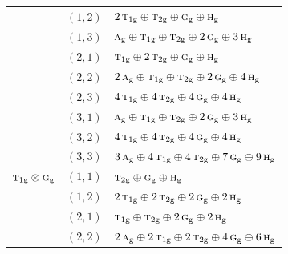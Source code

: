 \documentclass[11pt]{article}
\newcommand{\irr}[1]{\text{\normalfont\scshape #1}}
\newcommand{\ptag}[1]{\mathrm{#1}}
\begin{document}
\begin{longtable}{p{} c p{}}
 & $(1,2)$ & $2\,\irr{t}_{1\ptag{g}}\oplus \irr{t}_{2\ptag{g}}\oplus \irr{g}_{\ptag{g}}\oplus \irr{h}_{\ptag{g}}$\\

 & $(1,3)$ & $\irr{a}_{\ptag{g}}\oplus \irr{t}_{1\ptag{g}}\oplus \irr{t}_{2\ptag{g}}\oplus 2\,\irr{g}_{\ptag{g}}\oplus 3\,\irr{h}_{\ptag{g}}$\\

 & $(2,1)$ & $\irr{t}_{1\ptag{g}}\oplus 2\,\irr{t}_{2\ptag{g}}\oplus \irr{g}_{\ptag{g}}\oplus \irr{h}_{\ptag{g}}$\\

 & $(2,2)$ & $2\,\irr{a}_{\ptag{g}}\oplus \irr{t}_{1\ptag{g}}\oplus \irr{t}_{2\ptag{g}}\oplus 2\,\irr{g}_{\ptag{g}}\oplus 4\,\irr{h}_{\ptag{g}}$\\

 & $(2,3)$ & $4\,\irr{t}_{1\ptag{g}}\oplus 4\,\irr{t}_{2\ptag{g}}\oplus 4\,\irr{g}_{\ptag{g}}\oplus 4\,\irr{h}_{\ptag{g}}$\\

 & $(3,1)$ & $\irr{a}_{\ptag{g}}\oplus \irr{t}_{1\ptag{g}}\oplus \irr{t}_{2\ptag{g}}\oplus 2\,\irr{g}_{\ptag{g}}\oplus 3\,\irr{h}_{\ptag{g}}$\\

 & $(3,2)$ & $4\,\irr{t}_{1\ptag{g}}\oplus 4\,\irr{t}_{2\ptag{g}}\oplus 4\,\irr{g}_{\ptag{g}}\oplus 4\,\irr{h}_{\ptag{g}}$\\

 & $(3,3)$ & $3\,\irr{a}_{\ptag{g}}\oplus 4\,\irr{t}_{1\ptag{g}}\oplus 4\,\irr{t}_{2\ptag{g}}\oplus 7\,\irr{g}_{\ptag{g}}\oplus 9\,\irr{h}_{\ptag{g}}$\\

\hline

$\irr{t}_{1\ptag{g}}\otimes \irr{g}_{\ptag{g}}$ & $(1,1)$ & $\irr{t}_{2\ptag{g}}\oplus \irr{g}_{\ptag{g}}\oplus \irr{h}_{\ptag{g}}$\\

 & $(1,2)$ & $2\,\irr{t}_{1\ptag{g}}\oplus 2\,\irr{t}_{2\ptag{g}}\oplus 2\,\irr{g}_{\ptag{g}}\oplus 2\,\irr{h}_{\ptag{g}}$\\

 & $(2,1)$ & $\irr{t}_{1\ptag{g}}\oplus \irr{t}_{2\ptag{g}}\oplus 2\,\irr{g}_{\ptag{g}}\oplus 2\,\irr{h}_{\ptag{g}}$\\

 & $(2,2)$ & $2\,\irr{a}_{\ptag{g}}\oplus 2\,\irr{t}_{1\ptag{g}}\oplus 2\,\irr{t}_{2\ptag{g}}\oplus 4\,\irr{g}_{\ptag{g}}\oplus 6\,\irr{h}_{\ptag{g}}$\\


\end{longtable}
\end{document}
